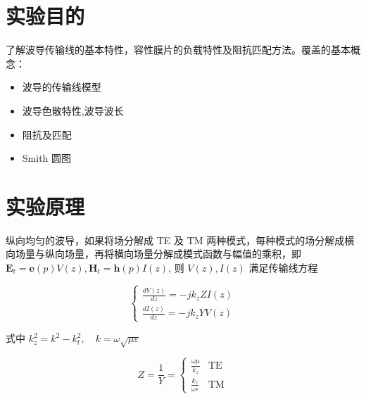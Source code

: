 \documentclass[12pt,hyperref,a4paper,UTF8]{ctexart}
\begin{document}
\cover

%
%

\thispagestyle{empty} %

\newpage
\tableofcontents

\newpage


\section{实验目的}
了解波导传输线的基本特性，容性膜片的负载特性及阻抗匹配方法。覆盖的基本概念：

\begin{itemize}[itemsep=-5pt, topsep=0pt, partopsep=0pt]
    \item 波导的传输线模型
    \item 波导色散特性,波导波长
    \item 阻抗及匹配
    \item Smith 圆图
\end{itemize}

\section{实验原理}

纵向均匀的波导，如果将场分解成 TE 及 TM 两种模式，每种模式的场分解成横向场量与纵向场量，再将横向场量分解成模式函数与幅值的乘积，即 $\mathbf{E}_t = \mathbf{e}(p)V(z), \mathbf{H}_t = \mathbf{h}(p)I(z)$, 则 $V(z), I(z)$ 满足传输线方程

\begin{equation}
\begin{cases}
\frac{dV(z)}{dz} = -jk_z Z I(z) \\
\frac{dI(z)}{dz} = -jk_z Y V(z)
\end{cases}
\tag{式 4-1}
\end{equation}

式中 $k_z^2 = k^2 - k_t^2, \quad k = \omega \sqrt{\mu \varepsilon}$

\begin{equation}
Z = \frac{1}{Y} = 
\begin{cases}
\frac{\omega \mu}{k_z} & \text{TE} \\
\frac{k_z}{\omega \varepsilon} & \text{TM}
\end{cases}
\tag{式 4-2}
\end{equation}
\end{document}
